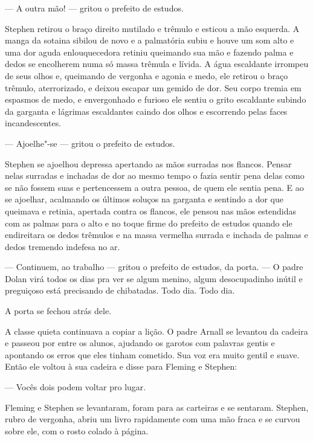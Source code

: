 --- A outra mão! --- gritou o prefeito de estudos.

Stephen retirou o braço direito mutilado e trêmulo e esticou a mão
esquerda. A manga da sotaina sibilou de novo e a palmatória subiu e
houve um som alto e uma dor aguda enlouquecedora retiniu queimando sua
mão e fazendo palma e dedos se encolherem numa só massa trêmula e
lívida. A água escaldante irrompeu de seus olhos e, queimando de
vergonha e agonia e medo, ele retirou o braço trêmulo, aterrorizado, e
deixou escapar um gemido de dor. Seu corpo tremia em espasmos de medo,
e envergonhado e furioso ele sentiu o grito escaldante subindo da
garganta e lágrimas escaldantes caindo dos olhos e escorrendo pelas
faces incandescentes.

 --- Ajoelhe"-se --- gritou o prefeito de estudos.

Stephen se ajoelhou depressa apertando as mãos surradas nos flancos.
Pensar nelas surradas e inchadas de dor ao mesmo tempo o fazia sentir
pena delas como se não fossem suas e pertencessem a outra pessoa, de
quem ele sentia pena. E ao se ajoelhar, acalmando os últimos soluços na
garganta e sentindo a dor que queimava e retinia, apertada contra os
flancos, ele pensou nas mãos estendidas com as palmas para o alto e no
toque firme do prefeito de estudos quando ele endireitara os dedos
trêmulos e na massa vermelha surrada e inchada de palmas e dedos
tremendo indefesa no ar.

 --- Continuem, ao trabalho --- gritou o prefeito de estudos, da porta. --- O
padre Dolan virá todos os dias pra ver se algum menino, algum
desocupadinho inútil e preguiçoso está precisando de chibatadas. Todo dia.
Todo dia.

A porta se fechou atrás dele.

A classe quieta continuava a copiar a lição. O padre Arnall se levantou
da cadeira e passeou por entre os alunos, ajudando os garotos com
palavras gentis e apontando os erros que eles tinham cometido. Sua voz
era muito gentil e suave. Então ele voltou à sua cadeira e disse para
Fleming e Stephen:

 --- Vocês dois podem voltar pro lugar.

Fleming e Stephen se levantaram, foram para as carteiras e se sentaram.
Stephen, rubro de vergonha, abriu um livro rapidamente com uma mão
fraca e se curvou sobre ele, com o rosto colado à página.

